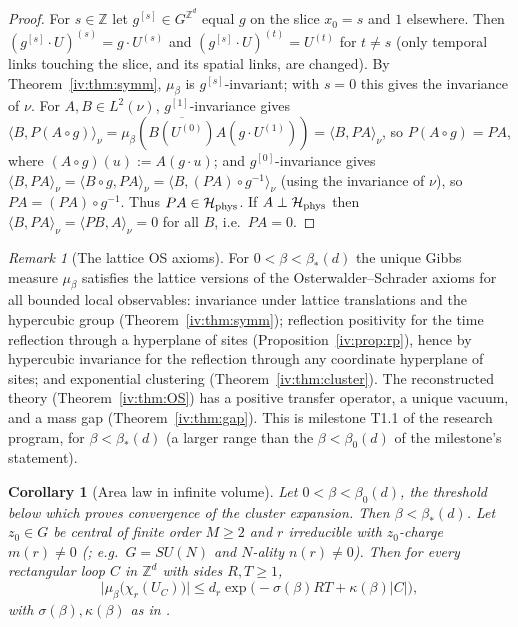 \documentclass[11pt,a4paper]{article}
\newtheorem{corollary}[theorem]{Corollary}
\theoremstyle{definition}
\theoremstyle{remark}
\newtheorem{remark}[theorem]{Remark}
\newcommand{\Z}{\mathbb{Z}}
\newcommand{\cH}{\mathcal{H}}
\newcommand{\ip}[2]{\langle #1,#2\rangle}
\newcommand{\Fref}[3]{\cite[#1~`#2' (\texttt{#3})]{F}}
\newcommand{\IIIref}[3]{\cite[#1~`#2' (\texttt{#3})]{III}}
\newcommand{\IIIlab}[2]{\cite[#1 \texttt{#2}]{III}}
\newcommand{\bS}{\beta_*}
\begin{document}
\begin{proof}
For $s\in\Z$ let $g^{[s]}\in G^{\Z^d}$ equal $g$ on the slice $x_0=s$ and $1$ elsewhere. Then $(g^{[s]}\cdot U)^{(s)}=g\cdot U^{(s)}$ and
$(g^{[s]}\cdot U)^{(t)}=U^{(t)}$ for $t\neq s$ (only temporal links touching the slice, and its spatial links, are changed). By
Theorem~\ref{iv:thm:symm}, $\mu_\beta$ is $g^{[s]}$-invariant; with $s=0$ this gives the invariance of $\nu$. For $A,B\in L^2(\nu)$,
$g^{[1]}$-invariance gives $\ip B{P(A\circ g)}_\nu=\mu_\beta(\overline{B(U^{(0)})}A(g\cdot U^{(1)}))=\ip B{PA}_\nu$, so $P(A\circ g)=PA$, where
$(A\circ g)(u):=A(g\cdot u)$; and $g^{[0]}$-invariance gives $\ip B{PA}_\nu=\ip{B\circ g}{PA}_\nu=\ip B{(PA)\circ g^{-1}}_\nu$ (using the
invariance of $\nu$), so $PA=(PA)\circ g^{-1}$. Thus $PA\in\cH_{\rm phys}$. If $A\perp\cH_{\rm phys}$ then
$\ip B{PA}_\nu=\ip{PB}A_\nu=0$ for all $B$, i.e.\ $PA=0$.
\end{proof}

\begin{remark}[The lattice OS axioms]\label{iv:rem:OSaxioms}
For $0<\beta<\bS(d)$ the unique Gibbs measure $\mu_\beta$ satisfies the lattice versions of the Osterwalder--Schrader axioms for all
bounded local observables: invariance under lattice translations and the hypercubic group (Theorem~\ref{iv:thm:symm}); reflection
positivity for the time reflection through a hyperplane of sites (Proposition~\ref{iv:prop:rp}), hence by hypercubic invariance for
the reflection through any coordinate hyperplane of sites; and exponential clustering (Theorem~\ref{iv:thm:cluster}). The
reconstructed theory (Theorem~\ref{iv:thm:OS}) has a positive transfer operator, a unique vacuum, and a mass gap
(Theorem~\ref{iv:thm:gap}). This is milestone T1.1 of the research program, for $\beta<\bS(d)$ (a larger range than the
$\beta<\beta_0(d)$ of the milestone's statement).
\end{remark}

\begin{corollary}[Area law in infinite volume]\label{iv:cor:arealaw}
Let $0<\beta<\beta_0(d)$, the threshold below which \Fref{Theorem}{Convergence of the strong-coupling cluster
expansion}{thm:conv} proves convergence of the cluster expansion. Then $\beta<\bS(d)$. Let $z_0\in G$ be central of finite order $M\ge2$
and $r$ irreducible with $z_0$-charge $m(r)\ne0$ (\IIIlab{Definition}{al:def:charge}; e.g.\ $G=SU(N)$ and $N$-ality $n(r)\ne0$). Then for every rectangular loop $C$ in $\Z^d$ with sides $R,T\ge1$,
\[
\bigl|\mu_\beta\bigl(\chi_r(U_C)\bigr)\bigr|\le d_r\exp\bigl(-\sigma(\beta)RT+\kappa(\beta)|C|\bigr),
\]
with $\sigma(\beta),\kappa(\beta)$ as in \IIIref{Definition}{Constants}{al:def:constants}.
\end{corollary}
\end{document}
